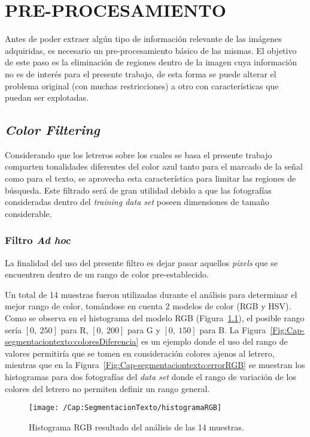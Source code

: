 \chapter{PRE-PROCESAMIENTO}
\label{cap-preprocesamiento}
\setcounter{secnumdepth}{0}
Antes de poder extraer algún tipo de información relevante de las imágenes
adquiridas, es necesario un pre-procesamiento básico de las mismas. El objetivo
de este paso es la eliminación de regiones dentro de la imagen cuya información
no es de interés para el presente trabajo, de esta forma se puede alterar el
problema original (con muchas restricciones) a otro con características que
puedan ser explotadas.

\setcounter{secnumdepth}{3}
\section{\textit{Color Filtering}}
Considerando que los letreros sobre los cuales se basa el presente trabajo
comparten tonalidades diferentes del color azul tanto para el marcado de la
señal como para el texto, se aprovecha esta característica para limitar las
regiones de búsqueda. Este filtrado será de gran utilidad debido a que las
fotografías consideradas dentro del \textit{training data set} poseen
dimensiones de tamaño considerable.

\subsection{Filtro \textit{Ad hoc}}
La finalidad del uso del presente filtro es dejar pasar aquellos
\textit{pixels} que se encuentren dentro de un rango de color pre-establecido.

Un total de 14 muestras fueron utilizadas durante el análisis para determinar
el mejor rango de color, tomándose en cuenta 2 modelos de color (RGB y HSV).
Como se observa en el histograma del modelo RGB
(Figura~\ref{Fig:Cap-segmentaciontexto:HistogramaRGB}), el posible rango sería
$[0,~250]$ para R, $[0,~200]$ para G y $[0,~150]$ para B. La
Figura~\ref{Fig:Cap-segmentaciontexto:coloresDiferencia} es un ejemplo donde el
uso del rango de valores permitiría que se tomen en consideración colores ajenos
al letrero, mientras que en la Figura~\ref{Fig:Cap-segmentaciontexto:errorRGB}
se muestran los histogramas para dos fotografías del \textit{data set} donde el
rango de variación de los colores del letrero no permiten definir un rango
general.

\begin{figure}[h!]
	\texttt{[image: /Cap:SegmentacionTexto/histogramaRGB]}
	\caption{Histograma RGB resultado del análisis de las 14 muestras.}
	\label{Fig:Cap-segmentaciontexto:HistogramaRGB}
\end{figure}

